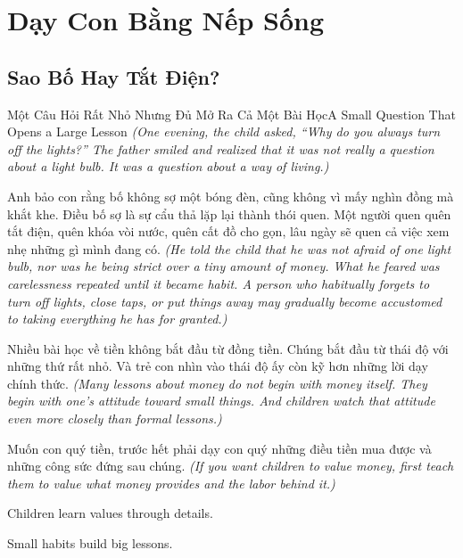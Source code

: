 \chapter{Dạy Con Bằng Nếp Sống}

\section{Sao Bố Hay Tắt Điện?}
\begin{truyen}{Một Câu Hỏi Rất Nhỏ Nhưng Đủ Mở Ra Cả Một Bài Học}{A Small Question That Opens a Large Lesson}
\textit{(One evening, the child asked, ``Why do you always turn off the lights?'' The father smiled and realized that it was not really a question about a light bulb. It was a question about a way of living.)}

Anh bảo con rằng bố không sợ một bóng đèn, cũng không vì mấy nghìn đồng mà khắt khe. Điều bố sợ là sự cẩu thả lặp lại thành thói quen. Một người quen quên tắt điện, quên khóa vòi nước, quên cất đồ cho gọn, lâu ngày sẽ quen cả việc xem nhẹ những gì mình đang có.
\textit{(He told the child that he was not afraid of one light bulb, nor was he being strict over a tiny amount of money. What he feared was carelessness repeated until it became habit. A person who habitually forgets to turn off lights, close taps, or put things away may gradually become accustomed to taking everything he has for granted.)}

Nhiều bài học về tiền không bắt đầu từ đồng tiền. Chúng bắt đầu từ thái độ với những thứ rất nhỏ. Và trẻ con nhìn vào thái độ ấy còn kỹ hơn những lời dạy chính thức.
\textit{(Many lessons about money do not begin with money itself. They begin with one’s attitude toward small things. And children watch that attitude even more closely than formal lessons.)}
\end{truyen}

\begin{baihoc}
Muốn con quý tiền, trước hết phải dạy con quý những điều tiền mua được và những công sức đứng sau chúng.
\textit{(If you want children to value money, first teach them to value what money provides and the labor behind it.)}
\end{baihoc}

\begin{ghinhoanh}
Children learn values through details.

Small habits build big lessons.
\end{ghinhoanh}

